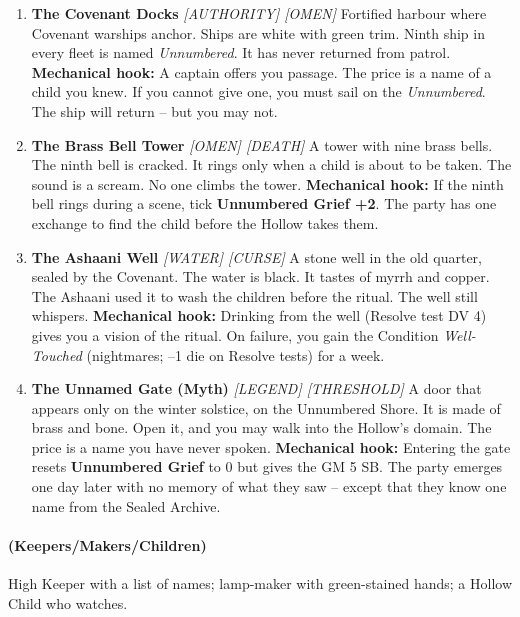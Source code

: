 \begin{enumerate}
\item[J] \textbf{The Covenant Docks} \hfill \textit{[AUTHORITY] [OMEN]}  
  Fortified harbour where Covenant warships anchor. Ships are white with green trim. Ninth ship in every fleet is named \textit{Unnumbered}. It has never returned from patrol.  
  \textbf{Mechanical hook:} A captain offers you passage. The price is a name of a child you knew. If you cannot give one, you must sail on the \textit{Unnumbered}. The ship will return -- but you may not.

\item[Q] \textbf{The Brass Bell Tower} \hfill \textit{[OMEN] [DEATH]}  
  A tower with nine brass bells. The ninth bell is cracked. It rings only when a child is about to be taken. The sound is a scream. No one climbs the tower.  
  \textbf{Mechanical hook:} If the ninth bell rings during a scene, tick \textbf{Unnumbered Grief +2}. The party has one exchange to find the child before the Hollow takes them.

\item[K] \textbf{The Ashaani Well} \hfill \textit{[WATER] [CURSE]}  
  A stone well in the old quarter, sealed by the Covenant. The water is black. It tastes of myrrh and copper. The Ashaani used it to wash the children before the ritual. The well still whispers.  
  \textbf{Mechanical hook:} Drinking from the well (Resolve test DV 4) gives you a vision of the ritual. On failure, you gain the Condition \textit{Well-Touched} (nightmares; --1 die on Resolve tests) for a week.

\item[A] \textbf{The Unnamed Gate (Myth)} \hfill \textit{[LEGEND] [THRESHOLD]}  
  A door that appears only on the winter solstice, on the Unnumbered Shore. It is made of brass and bone. Open it, and you may walk into the Hollow's domain. The price is a name you have never spoken.  
  \textbf{Mechanical hook:} Entering the gate resets \textbf{Unnumbered Grief} to 0 but gives the GM 5 SB. The party emerges one day later with no memory of what they saw -- except that they know one name from the Sealed Archive.
\end{enumerate}

\paragraph*{(Keepers/Makers/Children)} High Keeper with a list of names; lamp-maker with green-stained hands; a Hollow Child who watches.

